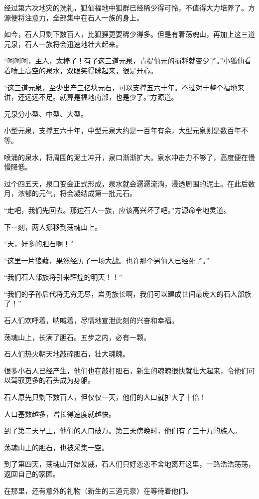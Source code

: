 \begin{this_body}
经过第六次地灾的洗礼，狐仙福地中狐群已经稀少得可怜，不值得大力培养了。方源便将注意力，全部集中在石人一族的身上。

如今，石人只剩下数百人，比狐狸更要稀少得多。但是有着荡魂山，再加上这三道元泉，石人一族将会迅速地壮大起来。

“呵呵呵，主人，太棒了！有了这三道元泉，青提仙元的损耗就变少了。”小狐仙看着喷上高空的泉水，双眼笑得眯起来，很是开心。

“这三道元泉，至少出产三亿块元石，可以支撑五六十年。不过对于整个福地来讲，还远远不足。就算是福地南部，也是少了。”方源道。

元泉分小型、中型、大型。

小型元泉，支撑五六十年，中型元泉大约是一百年有余，大型元泉则是数百年不等。

喷涌的泉水，将周围的泥土冲开，泉口渐渐扩大。泉水冲击力不够了，高度便在慢慢降低。

过个四五天，泉口变会正式形成，泉水就会潺潺流淌，浸透周围的泥土。在此后数月，浓郁的元气，将会凝结成第一批元石。

“走吧，我们先回去。那边石人一族，应该高兴坏了吧。”方源命令地灵道。

下一刻，两人挪移到荡魂山上。

“天，好多的胆石啊！”

“这里一片狼藉，果然经历了一场大战。也许那个男仙人已经死了。”

“我们石人部族将引来辉煌的明天！！”

“我们的子孙后代将无穷无尽，岩勇族长啊，我们可以建成世间最庞大的石人部族了！”

石人们欢呼着，呐喊着，尽情地宣泄此刻的兴奋和幸福。

荡魂山上，长满了胆石。五步之内，必有一颗。

石人们热火朝天地敲碎胆石，壮大魂魄。

很多小石人已经产生，他们也在敲打胆石，新生的魂魄很快就壮大起来，令他们可以驾驭更多的石头成为身躯。

石人原先只剩下数百人，但仅仅一天，他们的人口就扩大了十倍！

人口基数越多，增长得速度就越快。

到了第二天早上，他们的人口破万。第三天傍晚时，他们有了三十万的族人。

荡魂山上的胆石，也被采集一空。

到了第四天，荡魂山开始发威，石人们只好恋恋不舍地离开这里，一路浩浩荡荡，返回自己的家园。

在那里，还有意外的礼物（新生的三道元泉）在等待着他们。

\end{this_body}

